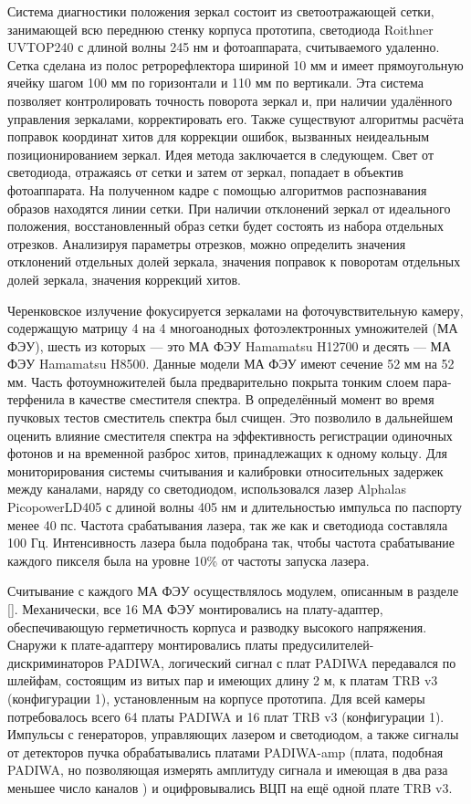 Система диагностики положения зеркал состоит из светоотражающей сетки, занимающей всю переднюю стенку корпуса прототипа, светодиода Roithner UVTOP240 с длиной волны 245 нм и фотоаппарата, считываемого удаленно. Сетка сделана из полос ретрорефлектора шириной 10 мм и имеет прямоугольную ячейку шагом 100 мм по горизонтали и 110 мм по вертикали. Эта система позволяет контролировать точность поворота зеркал и, при наличии удалённого управления зеркалами, корректировать его. Также существуют алгоритмы расчёта поправок координат хитов для коррекции ошибок, вызванных неидеальным позиционированием зеркал. Идея метода заключается в следующем. Свет от светодиода, отражаясь от сетки и затем от зеркал, попадает в объектив фотоаппарата. На полученном кадре с помощью алгоритмов распознавания образов находятся линии сетки. При наличии отклонений зеркал от идеального положения, восстановленный образ сетки будет состоять из набора отдельных отрезков. Анализируя параметры отрезков, можно определить значения отклонений отдельных долей зеркала, значения поправок к поворотам отдельных долей зеркала, значения коррекций хитов.

Черенковское излучение фокусируется зеркалами на фоточувствительную камеру, содержащую матрицу 4 на 4 многоанодных фотоэлектронных умножителей (МА ФЭУ), шесть из которых --- это МА ФЭУ Hamamatsu H12700 и десять --- МА ФЭУ Hamamatsu H8500. Данные модели МА ФЭУ имеют сечение 52 мм на 52 мм. Часть фотоумножителей была предварительно покрыта тонким слоем пара-терфенила в качестве сместителя спектра. В определённый момент во время пучковых тестов сместитель спектра был счищен. Это позволило в дальнейшем оценить влияние сместителя спектра на эффективность регистрации одиночных фотонов и на временной разброс хитов, принадлежащих к одному кольцу. Для мониторирования системы считывания и калибровки относительных задержек между каналами, наряду со светодиодом, использовался лазер Alphalas PicopowerLD405 с длиной волны 405 нм и длительностью импульса по паспорту менее 40 пс. Частота срабатывания лазера, так же как и светодиода составляла 100 Гц. Интенсивность лазера была подобрана так, чтобы частота срабатывание каждого пикселя была на уровне 10\% от частоты запуска лазера.

Считывание с каждого МА ФЭУ осуществлялось модулем, описанным в разделе \ref{}. Механически, все 16 МА ФЭУ монтировались на плату-адаптер, обеспечивающую герметичность корпуса и разводку высокого напряжения. Снаружи к плате-адаптеру монтировались платы предусилителей-дискриминаторов PADIWA, логический сигнал с плат PADIWA передавался по шлейфам, состоящим из витых пар и имеющих длину 2 м, к платам TRB v3 (конфигурации 1), установленным на корпусе прототипа. Для всей камеры потребовалось всего 64 платы PADIWA и 16 плат TRB v3 (конфигурации 1). Импульсы с генераторов, управляющих лазером и светодиодом, а также сигналы от детекторов пучка обрабатывались платами PADIWA-amp (плата, подобная PADIWA, но позволяющая измерять амплитуду сигнала и имеющая в два раза меньшее число каналов \cite{}) и оцифровывались ВЦП на ещё одной плате TRB v3.

